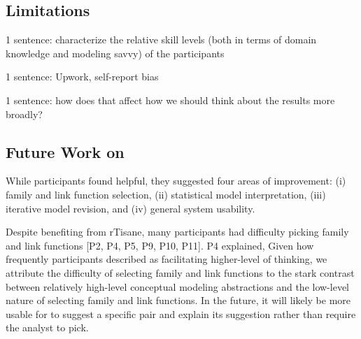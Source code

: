 
\subsection{Limitations}

1 sentence: characterize the relative skill levels (both in terms of domain knowledge and
modeling savvy) of the participants

1 sentence: Upwork, self-report bias

1 sentence: how does that affect how we should
think about the results more broadly?

\subsection{Future Work on \rTisane}
While participants found \rTisane helpful, they suggested four areas of
improvement: (i) family and link function selection, (ii) statistical model
interpretation, (iii) iterative model revision, and (iv) general system
usability. 

Despite benefiting from rTisane, many participants had difficulty picking family
and link functions [P2, P4, P5, P9, P10, P11]. P4 explained,  Given how frequently participants
described \rTisane as facilitating higher-level of thinking, we attribute the
difficulty of selecting family and link functions to the stark contrast between
\rTisanes relatively high-level conceptual modeling abstractions and the
low-level nature of selecting family and link functions. In the future, it will
likely be more usable for \rTisane to suggest a specific pair and explain its
suggestion rather than require the analyst to pick.

